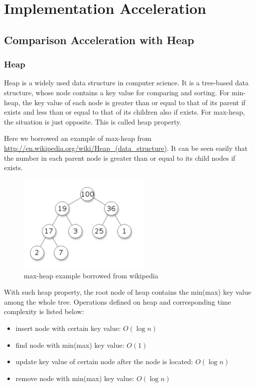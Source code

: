\chapter{Implementation Acceleration}

\section{Comparison Acceleration with Heap}

\subsection{Heap}

Heap is a widely used data structure in computer science. It is a tree-based data structure, whose node contains a key value for comparing and sorting. For min-heap, the key value of each node is greater than or equal to that of its parent if exists and less than or equal to that of its children also if exists. For max-heap, the situation is just opposite. This is called heap property.

Here we borrowed an example of max-heap from \url{http://en.wikipedia.org/wiki/Heap_(data_structure)}. It can be seen easily that the number in each parent node is greater than or equal to its child nodes if exists.

\begin{figure}[ht]
\centering
\includegraphics[width=64mm]{heap.png}
\caption{max-heap example borrowed from wikipedia}
\end{figure}

With such heap property, the root node of heap contains the min(max) key value among the whole tree. Operations defined on heap and corresponding time complexity is listed below:

\begin{itemize}
\item insert node with certain key value: $O(\log n)$
\item find node with min(max) key value: $O(1)$
\item update key value of certain node after the node is located: $O(\log n)$
\item remove node with min(max) key value: $O(\log n)$
\end{itemize}

